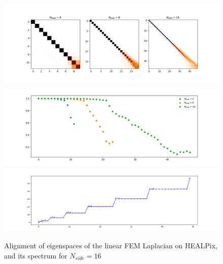 \begin{figure}[h!]	
	\centering
	\includegraphics[width=\linewidth]{../codes/03.FEM_laplacian/HEALPix/img/linearFEM.png}\\
	\includegraphics[width=\linewidth]{../codes/03.FEM_laplacian/HEALPix/img/linearFEM_diagonal.png}	\\
	\includegraphics[width=\linewidth]{../codes/03.FEM_laplacian/HEALPix/img/FEM_eigenvalues_16.png}	\\
	\caption{	\label{fig:FEMHealpix}Alignment of eigenspaces of the linear FEM Laplacian on HEALPix, and its spectrum for $N_{side}=16$}
\end{figure}
